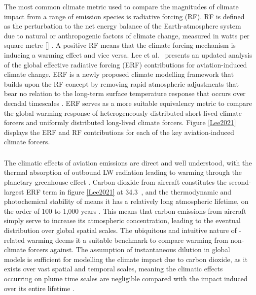 The most common climate metric used to compare the magnitudes of climate impact from a range of emission species is radiative forcing (RF). RF is defined as the perturbation to the net energy balance of the Earth-atmosphere system due to natural or anthropogenic factors of climate change, measured in watts per square metre [] \cite{Fuglestvedt2003}. A positive RF means that the climate forcing mechanism is inducing a warming effect and vice versa. Lee et al.\ \cite{Lee2021} presents an updated analysis of the global effective radiative forcing (ERF) contributions for aviation-induced climate change. ERF is a newly proposed climate modelling framework that builds upon the RF concept by removing rapid atmospheric adjustments that bear no relation to the long-term surface temperature response that occurs over decadal timescales \cite{Myhre2013}. ERF serves as a more suitable equivalency metric to compare the global warming response of heterogeneously distributed short-lived climate forcers and uniformly distributed long-lived climate forcers. Figure \ref{Lee2021} displays the ERF and RF contributions for each of the key aviation-induced climate forcers.

\subsubsection{}
The climatic effects of aviation  emissions are direct and well understood, with the thermal absorption of outbound LW radiation leading to warming through the planetary greenhouse effect \cite{Schneider1989}. Carbon dioxide from aircraft constitutes the second-largest ERF term in figure \ref{Lee2021} at 34.3~, and the thermodynamic and photochemical stability of  means it has a relatively long atmospheric lifetime, on the order of 100 to 1,000 years \cite{Archer2008}. This means that carbon emissions from aircraft simply serve to increase its atmospheric concentration, leading to the eventual distribution over global spatial scales. The ubiquitous and intuitive nature of -related warming deems it a suitable benchmark to compare warming from non- climate forcers against. The assumption of instantaneous dilution in global models is sufficient for modelling the climate impact due to carbon dioxide, as it exists over vast spatial and temporal scales, meaning the climatic effects occurring on plume time scales are negligible compared with the impact induced over its entire lifetime \cite{Paoli2011}.

